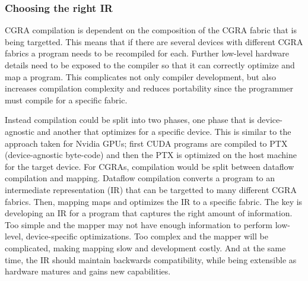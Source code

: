 \subsubsection{Choosing the right IR}
CGRA compilation is dependent on the composition of the CGRA fabric that is being targetted.
% 
This means that if there are several devices with different CGRA fabrics a program needs to be recompiled for each.
% 
Further low-level hardware details need to be exposed to the compiler so that it can correctly optimize and map a program.
% 
This complicates not only compiler development, but also increases compilation complexity and reduces portability since the programmer must compile for a specific fabric.


Instead compilation could be split into two phases, one phase that is device-agnostic and another that optimizes for a specific device.
% 
This is similar to the approach taken for Nvidia GPUs; first CUDA programs are compiled to PTX~\cite{ptx} (device-agnostic byte-code) and then the PTX is optimized on the host machine for the target device.
% 
For CGRAs, compilation would be split between dataflow compilation and mapping.
% 
Dataflow compilation converts a program to an intermediate representation (IR) that can be targetted to many different CGRA fabrics.
% 
Then, mapping maps and optimizes the IR to a specific fabric.
% 
The key is developing an IR for a program that captures the right amount of information.
% 
Too simple and the mapper may not have enough information to perform low-level, device-specific optimizations.
% 
Too complex and the mapper will be complicated, making mapping slow and development costly.
%
And at the same time, the IR should maintain backwards compatibility, while being extensible as hardware matures and gains new capabilities.
% 

